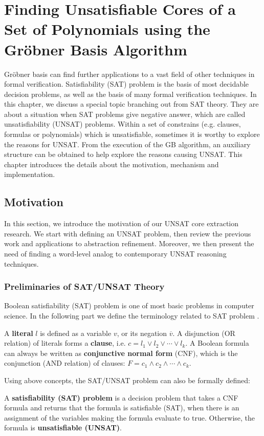 \chapter{Finding Unsatisfiable Cores of a Set of Polynomials using the Gr\"obner Basis Algorithm}
\label{ch:UNSAT}
Gr\"obner basis can find further applications to a vast field
of other techniques in formal verification. Satisfiability (SAT) problem is the basis of 
most decidable decision problems, as well as the basis of many formal verification techniques. 
In this chapter, we discuss a special topic branching out from SAT theory. They are about a situation 
when SAT problems give negative answer, which are called unsatisfiability (UNSAT) problems. Within 
a set of constrains (e.g. clauses, formulas or polynomials) which is unsatisfiable, sometimes 
it is worthy to explore the reasons for UNSAT. From the execution of the GB algorithm, 
an auxiliary structure can be obtained to help explore the reasons causing UNSAT. This chapter introduces the 
details about the motivation, mechanism and implementation. 

\section{Motivation}
In this section, we introduce the motivation of our UNSAT core extraction research. We
start with defining an UNSAT problem, then review the previous work and applications 
to abstraction refinement. Moreover, we then present the need of finding a word-level 
analog to contemporary UNSAT reasoning techniques.

\subsection{Preliminaries of SAT/UNSAT Theory}
Boolean satisfiability (SAT) problem is one of most basic problems in computer science.
In the following part we define the terminology related to SAT problem \cite{anaICCAD}.

\begin{Definition}
A {\bf literal} $l$ is defined as a variable $v$, or its negation $\overline{v}$. A disjunction (OR relation)
of literals forms a {\bf clause}, i.e. $c = l_1\lor l_2 \lor \cdots \lor l_k$. 
A Boolean formula can always be written as {\bf conjunctive normal form} (CNF),
which is the conjunction (AND relation) of clauses: $F = c_1\land c_2\land\cdots\land c_k$.
\end{Definition}

Using above concepts, the SAT/UNSAT problem can also be formally defined:
\begin{Definition}
A {\bf satisfiability (SAT) problem} is a decision problem that takes a CNF formula and returns
that the formula is satisfiable (SAT), when there is an assignment of the variables making the 
formula evaluate to true. Otherwise, the formula is {\bf unsatisfiable (UNSAT)}.
\end{Definition}

